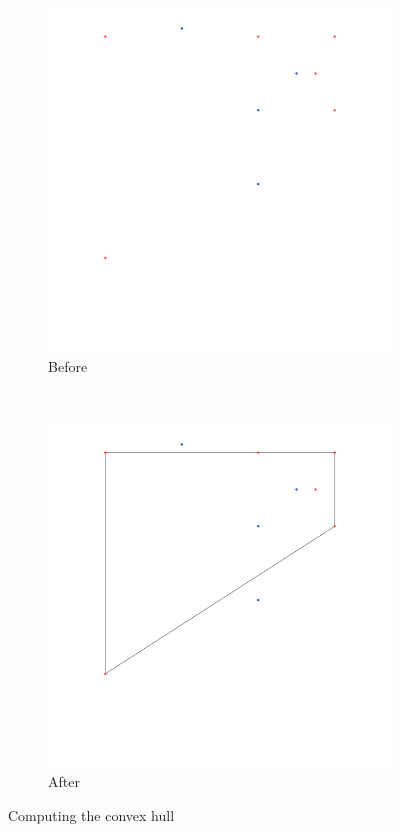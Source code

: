 \documentclass[paper=a4, fontsize=11pt]{scrartcl} %
\numberwithin{equation}{section} %
\numberwithin{figure}{section} %
\numberwithin{table}{section} %
\begin{document}
\begin{figure}
        \centering
        \begin{subfigure}[b]{0.4\textwidth}
                \includegraphics[width=\textwidth]{chull_before}
                \caption{Before}
        \end{subfigure}%
        ~ %
        \begin{subfigure}[b]{0.4\textwidth}
                \includegraphics[width=\textwidth]{chull_after}
                \caption{After}
        \end{subfigure}
        \caption{Computing the convex hull}\label{fig:chull}
\end{figure}
\end{document}
